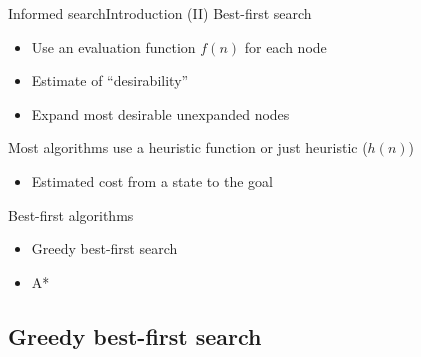 \documentclass[10pt,compress]{beamer} %
\begin{document}
\begin{frame}{Informed search}{Introduction (II)}
    Best-first search
      \begin{itemize}
        \item Use an evaluation function $f(n)$ for each node
        \item Estimate of ``desirability''
        \item Expand most desirable unexpanded nodes
      \end{itemize}

    Most algorithms use a \alert{heuristic function} or just \alert{heuristic} ($h(n)$)
      \begin{itemize}
        \item Estimated cost from a state to the goal
      \end{itemize}

    Best-first algorithms
      \begin{itemize}
        \item Greedy best-first search
        \item A*
      \end{itemize}
\end{frame}

\subsection{Greedy best-first search}
\end{document}

